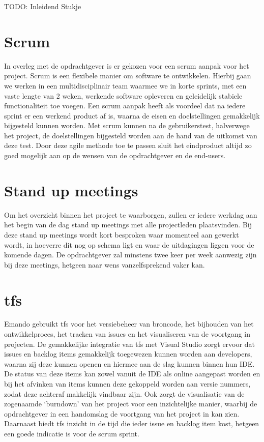 {\par \bigskip \par \color{red} TODO: Inleidend Stukje \par \bigskip \par }

\section{Scrum}
In overleg met de opdrachtgever is er gekozen voor een scrum aanpak voor het project. Scrum is een flexibele manier om software te ontwikkelen. Hierbij gaan we werken in een multidisciplinair team waarmee we in korte sprints, met een vaste lengte van 2 weken, werkende software opleveren en geleidelijk stabiele functionaliteit toe voegen. Een scrum aanpak heeft als voordeel dat na iedere sprint er een werkend product af is, waarna de eisen en doelstellingen gemakkelijk bijgesteld kunnen worden. Met scrum kunnen na de gebruikerstest, halverwege het project, de doelstellingen bijgesteld worden aan de hand van de uitkomst van deze test. Door deze agile methode toe te passen sluit het eindproduct altijd zo goed mogelijk aan op de wensen van de opdrachtgever en de end-users.

\section{Stand up meetings}
Om het overzicht binnen het project te waarborgen, zullen er iedere werkdag aan het begin van de dag stand up meetings met alle projectleden plaatsvinden. Bij deze stand up meetings wordt kort besproken waar momenteel aan gewerkt wordt, in hoeverre dit nog op schema ligt en waar de uitdagingen liggen voor de komende dagen. De opdrachtgever zal minstens twee keer per week aanwezig zijn bij deze meetings, hetgeen naar wens vanzelfsprekend vaker kan.

\section{\acl{tfs}}
Emando gebruikt \ac{tfs} voor het versiebeheer van broncode, het bijhouden van het ontwikkelproces, het tracken van issues en het visualiseren van de voortgang in projecten. De gemakkelijke integratie van \ac{tfs} met Visual Studio zorgt ervoor dat issues en backlog items gemakkelijk toegewezen kunnen worden aan developers, waarna zij deze kunnen openen en hiermee aan de slag kunnen binnen hun IDE. De status van deze items kan zowel vanuit de IDE als online aangepast worden en bij het afvinken van items kunnen deze gekoppeld worden aan versie nummers, zodat deze achteraf makkelijk vindbaar zijn.
Ook zorgt de visualisatie van de zogenaamde ‘burndown’ van het project voor een inzichtelijke manier, waarbij de opdrachtgever in een handomslag de voortgang van het project in kan zien. Daarnaast biedt \ac{tfs} inzicht in de tijd die ieder issue en backlog item kost, hetgeen een goede indicatie is voor de scrum sprint.

